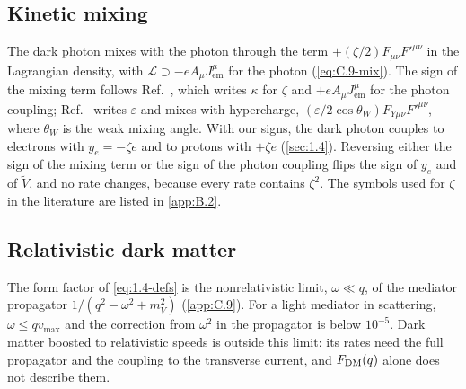 \subsection{Kinetic mixing}

The dark photon mixes with the photon through the term $+(\zeta/2)F_{\mu\nu}F'^{\mu\nu}$ in the Lagrangian density, with $\mathcal{L} \supset -eA_\mu J^\mu_{\mathrm{em}}$ for the photon (\cref{eq:C.9-mix}). The sign of the mixing term follows Ref.~\cite[Eq.~(70)]{lin2019tasi}, which writes $\kappa$ for $\zeta$ and $+eA_\mu J^\mu_{\mathrm{em}}$ for the photon coupling; Ref.~\cite[Eq.~(2.1)]{essig2016direct} writes $\varepsilon$ and mixes with hypercharge, $(\varepsilon/2\cos\theta_W)F_{Y\mu\nu}F'^{\mu\nu}$, where $\theta_W$ is the weak mixing angle. With our signs, the dark photon couples to electrons with $y_e = -\zeta e$ and to protons with $+\zeta e$ (\cref{sec:1.4}). Reversing either the sign of the mixing term or the sign of the photon coupling flips the sign of $y_e$ and of $\tilde V$, and no rate changes, because every rate contains $\zeta^2$. The symbols used for $\zeta$ in the literature are listed in \cref{app:B.2}.

\subsection{Relativistic dark matter}

The form factor of \cref{eq:1.4-defs} is the nonrelativistic limit, $\omega \ll q$, of the mediator propagator $1/(q^2 - \omega^2 + m_V^2)$ (\cref{app:C.9}). For a light mediator in scattering, $\omega \le qv_{\mathrm{max}}$ and the correction from $\omega^2$ in the propagator is below $10^{-5}$. Dark matter boosted to relativistic speeds is outside this limit: its rates need the full propagator and the coupling to the transverse current, and $F_{\mathrm{DM}}(q)$ alone does not describe them.
